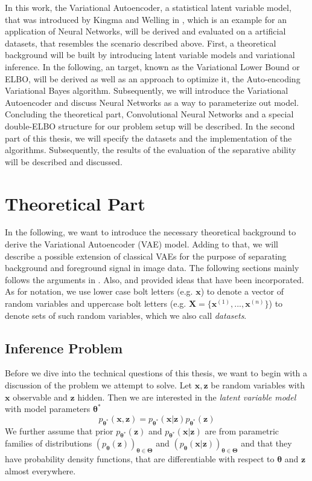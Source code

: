 \documentclass[12pt]{report}
\theoremstyle{definition}
\begin{document}
In this work, the Variational Autoencoder, a statistical latent variable model, that was introduced by Kingma and Welling in \cite{kingma2}, which is an example for an application of Neural Networks, will be derived and evaluated on a artificial datasets, that resembles the scenario described above. First, a theoretical background will be built by introducing latent variable models and variational inference. In the following, an target, known as the Variational Lower Bound or ELBO, will be derived as well as an approach to optimize it, the Auto-encoding Variational Bayes algorithm. Subsequently, we will introduce the Variational Autoencoder and discuss Neural Networks as a way to parameterize out model. Concluding the theoretical part, Convolutional Neural Networks and a special double-ELBO structure for our problem setup will be described.
In the second part of this thesis, we will specify the datasets and the implementation of the algorithms. Subsequently, the results of the evaluation of the separative ability will be described and discussed.

\chapter{Theoretical Part}

In the following, we want to introduce the necessary theoretical background to derive the Variational Autoencoder (VAE) model. Adding to that, we will describe a possible extension of classical VAEs for the purpose of separating background and foreground signal in image data.
The following sections mainly follows the arguments in \cite{kingma1}. Also, \cite{kingma2} and \cite{stanford} provided ideas that have been incorporated. As for notation, we use lower case bolt letters (e.g. $\mathbf{x}$) to denote a vector of random variables and uppercase bolt letters (e.g. $\mathbf{X} = \{ \mathbf{x}^{(1)}, ..., \mathbf{x}^{(n)}\}$) to denote sets of such random variables, which we also call \emph{datasets}.

\section{Inference Problem}
Before we dive into the technical questions of this thesis, we want to begin with a discussion of the problem we attempt to solve. Let $\mathbf{x}, \mathbf{z}$ be random variables with $\mathbf{x}$ observable and $\mathbf{z}$ hidden. Then we are interested in the \textit{latent variable model} with model parameters $\pmb{\theta}^*$
\begin{equation}
	p_{\pmb{\theta}^*}(\mathbf{x}, \mathbf{z}) = p_{\pmb{\theta}^*}(\mathbf{x}| \mathbf{z})p_{\pmb{\theta}^*}(\mathbf{z})
\end{equation}
We further assume that prior $p_{\pmb{\theta}^*}(\mathbf{z})$ and $p_{\pmb{\theta}^*}(\mathbf{x}|\mathbf{z})$ are from parametric families of distributions $(p_{\pmb{\theta}}(\mathbf{z}))_{\pmb{\theta} \in \pmb{\Theta}}$ and $(p_{\pmb{\theta}}(\mathbf{x}|\mathbf{z}))_{\pmb{\theta} \in \pmb{\Theta}}$ and that they have probability density functions, that are differentiable with respect to $\pmb{\theta}$ and $\mathbf{z}$ almost everywhere.
\end{document}
